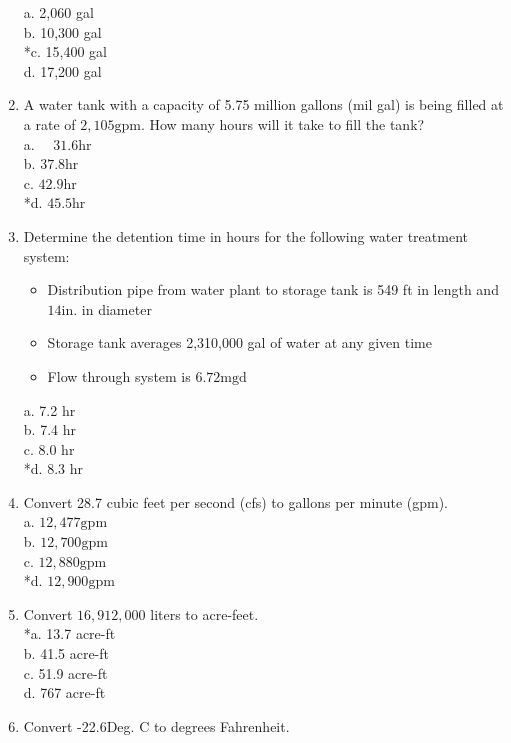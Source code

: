 \begin{enumerate}
a. 2,060 gal\\
b. 10,300 gal\\
*c. 15,400 gal\\
d. 17,200 gal\\
\item A water tank with a capacity of 5.75 million gallons (mil gal) is being filled at a rate of $2,105 \mathrm{gpm}$. How many hours will it take to fill the tank?\\
a. $\quad 31.6 \mathrm{hr}$\\
b. $37.8 \mathrm{hr}$\\
c. $42.9 \mathrm{hr}$\\
*d. $45.5 \mathrm{hr}$\\
  \item Determine the detention time in hours for the following water treatment system:\\
\begin{itemize}
  \item Distribution pipe from water plant to storage tank is 549 ft in length and $14 \mathrm{in}$. in diameter\\
  \item Storage tank averages 2,310,000 gal of water at any given time\\
  \item Flow through system is $6.72 \mathrm{mgd}$\\
\end{itemize}
a. 7.2 hr\\
b. 7.4 hr\\
c. 8.0 hr\\
*d. 8.3 hr\\
  \item Convert 28.7 cubic feet per second (cfs) to gallons per minute (gpm).\\
a. $12,477 \mathrm{gpm}$\\
b. $12,700 \mathrm{gpm}$\\
c. $12,880 \mathrm{gpm}$\\
*d. $12,900 \mathrm{gpm}$\\
  \item Convert $16,912,000$ liters to acre-feet.\\
*a. 13.7 acre-ft\\
b. 41.5 acre-ft\\
c. 51.9 acre-ft\\
d. 767 acre-ft\\
  \item Convert -22.6Deg. C to degrees Fahrenheit.\\

\end{enumerate}
